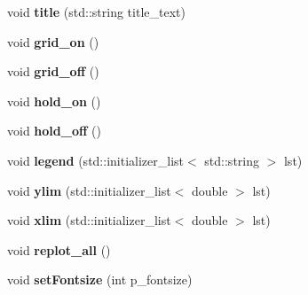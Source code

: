 \begin{DoxyCompactItemize}
\item 
\hypertarget{classkeycpp_1_1_figure_a922bd966ed40095f0ae7fa184f9d0ada}{void {\bfseries title} (std\-::string title\-\_\-text)}\label{classkeycpp_1_1_figure_a922bd966ed40095f0ae7fa184f9d0ada}

\item 
\hypertarget{classkeycpp_1_1_figure_a3c036559f8ad56b099ac0b44c652225d}{void {\bfseries grid\-\_\-on} ()}\label{classkeycpp_1_1_figure_a3c036559f8ad56b099ac0b44c652225d}

\item 
\hypertarget{classkeycpp_1_1_figure_a3736e01bc278c2c2b47e4ff046fdda0e}{void {\bfseries grid\-\_\-off} ()}\label{classkeycpp_1_1_figure_a3736e01bc278c2c2b47e4ff046fdda0e}

\item 
\hypertarget{classkeycpp_1_1_figure_a65b80e5b67c7bbf225e3001a538a6dad}{void {\bfseries hold\-\_\-on} ()}\label{classkeycpp_1_1_figure_a65b80e5b67c7bbf225e3001a538a6dad}

\item 
\hypertarget{classkeycpp_1_1_figure_ae5e5ac67e9450ea4fbf06fb3fcc6523a}{void {\bfseries hold\-\_\-off} ()}\label{classkeycpp_1_1_figure_ae5e5ac67e9450ea4fbf06fb3fcc6523a}

\item 
\hypertarget{classkeycpp_1_1_figure_a315140182f731518bc1f6f037a12c3a5}{void {\bfseries legend} (std\-::initializer\-\_\-list$<$ std\-::string $>$ lst)}\label{classkeycpp_1_1_figure_a315140182f731518bc1f6f037a12c3a5}

\item 
\hypertarget{classkeycpp_1_1_figure_aa01c44e6509c7075f4f547531c39741b}{void {\bfseries ylim} (std\-::initializer\-\_\-list$<$ double $>$ lst)}\label{classkeycpp_1_1_figure_aa01c44e6509c7075f4f547531c39741b}

\item 
\hypertarget{classkeycpp_1_1_figure_ae779c53eebbee42148324bd8adfd7d01}{void {\bfseries xlim} (std\-::initializer\-\_\-list$<$ double $>$ lst)}\label{classkeycpp_1_1_figure_ae779c53eebbee42148324bd8adfd7d01}

\item 
\hypertarget{classkeycpp_1_1_figure_a47cae082612e5436a6b0bc3d7f27e9d9}{void {\bfseries replot\-\_\-all} ()}\label{classkeycpp_1_1_figure_a47cae082612e5436a6b0bc3d7f27e9d9}

\item 
\hypertarget{classkeycpp_1_1_figure_ab8d777d1b44e242b104350093ef09543}{void {\bfseries set\-Fontsize} (int p\-\_\-fontsize)}\label{classkeycpp_1_1_figure_ab8d777d1b44e242b104350093ef09543}


\end{DoxyCompactItemize}
